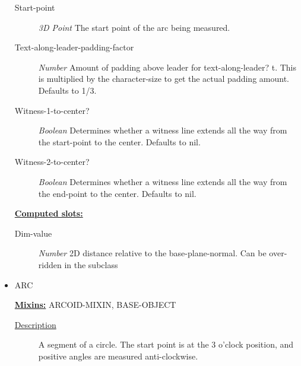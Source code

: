 \documentclass [11pt]{book}
\begin{document}
\begin{itemize}
\begin{description}
\item [Start-point]
\emph{3D Point} The start point  of the arc being measured.


\item [Text-along-leader-padding-factor]
\emph{Number} Amount of padding above leader for text-along-leader? t. This is multiplied by the
character-size to get the actual padding amount. Defaults to 1/3.


\item [Witness-1-to-center?]
\emph{Boolean} Determines whether a witness line extends all the way from the start-point to the center.
Defaults to nil.


\item [Witness-2-to-center?]
\emph{Boolean} Determines whether a witness line extends all the way from the end-point to the center.
Defaults to nil.


\end{description}






\textbf{
\underline{Computed slots:}}

\begin{description}

\item [Dim-value]
\emph{Number} 2D distance relative to the base-plane-normal. Can be over-ridden in the subclass


\end{description}







\item {}ARC


\textbf{
\underline{Mixins:}} ARCOID-MIXIN, BASE-OBJECT





\begin{description}

\item [
\underline{Description}]


A segment of a circle.
The start point is at the 3 o'clock position, and positive
angles are measured anti-clockwise.




\end{description}
\end{itemize}
\end{document}
